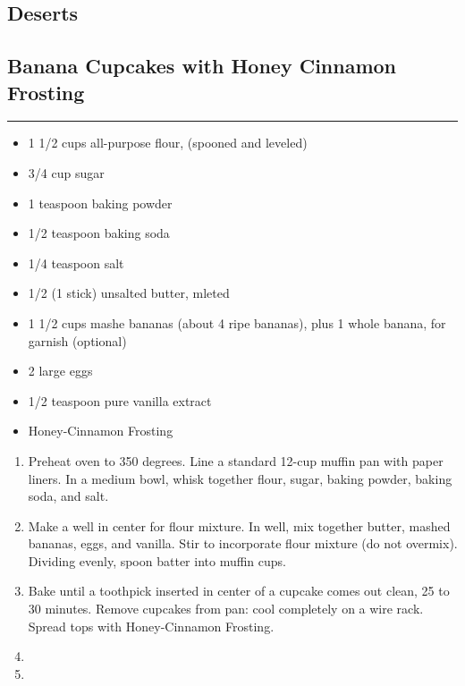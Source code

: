 \documentclass{article}
\begin{document}
\vspace*{\fill}
\begin{center}
    \section{Deserts}
\end{center}
\vspace*{\fill}
\newpage

\subsection{Banana Cupcakes with Honey Cinnamon Frosting} 
\noindent\rule[0.5ex]{\linewidth}{1pt}

\begin{framed}
    \begin{itemize}
        \item 1 1/2 cups all-purpose flour, (spooned and leveled)
        \item 3/4 cup sugar
        \item 1 teaspoon baking powder
        \item 1/2 teaspoon baking soda
        \item 1/4 teaspoon salt
        \item 1/2 (1 stick) unsalted butter, mleted
        \item 1 1/2 cups mashe bananas (about 4 ripe bananas), plus 1 whole banana, for garnish (optional)
        \item 2 large eggs
        \item 1/2 teaspoon pure vanilla extract
        \item Honey-Cinnamon Frosting
    \end{itemize}
\end{framed}

\begin{enumerate}
    \item 
        Preheat oven to 350 degrees. Line a standard 12-cup muffin pan with paper liners. In a medium bowl, whisk together flour, sugar, baking powder, baking soda, and salt.
    \item 
        Make a well in center for flour mixture. In well, mix together butter, mashed bananas, eggs, and vanilla. Stir to incorporate flour mixture (do not overmix). Dividing evenly, spoon batter into muffin cups.
    \item 
        Bake until a toothpick inserted in center of a cupcake comes out clean, 25 to 30 minutes. Remove cupcakes from pan: cool completely on a wire rack. Spread tops with Honey-Cinnamon Frosting.
    \item 
    \item 
\end{enumerate}
\end{document}

